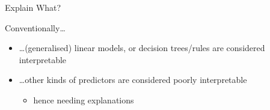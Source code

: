 \documentclass[presentation]{beamer}\mode<presentation>{\usetheme{AMSBolognaFC}}
\begin{document}
\begin{frame}[allowframebreaks]{Explain What?}
    \framebreak

    \begin{alertblock}{Conventionally\ldots}
        \begin{itemize}
            \item \ldots (generalised) linear models, or decision trees/rules are \alert{considered} interpretable
            \item \ldots other kinds of predictors are considered \alert{poorly} interpretable
            \begin{itemize}
                \item hence needing \alert{explanations}
            \end{itemize}
        \end{itemize}
    \end{alertblock}
    
\end{frame}
\end{document}
